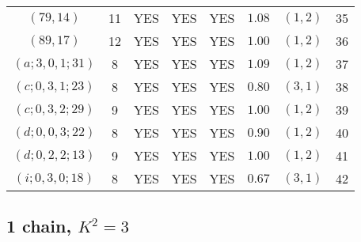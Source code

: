\begin{longtable}{|c|c|c|c|c|c|c|c|}
$(79,14)$ & 11 & YES & YES & YES & $1.08$ & $(1,2)$ & 35\\
$(89,17)$ & 12 & YES & YES & YES & $1.00$ & $(1,2)$ & 36\\
$(a;3,0,1;31)$ & 8 & YES & YES & YES & $1.09$ & $(1,2)$ & 37\\
$(c;0,3,1;23)$ & 8 & YES & YES & YES & $0.80$ & $(3,1)$ & 38\\
$(c;0,3,2;29)$ & 9 & YES & YES & YES & $1.00$ & $(1,2)$ & 39\\
$(d;0,0,3;22)$ & 8 & YES & YES & YES & $0.90$ & $(1,2)$ & 40\\
$(d;0,2,2;13)$ & 9 & YES & YES & YES & $1.00$ & $(1,2)$ & 41\\
$(i;0,3,0;18)$ & 8 & YES & YES & YES & $0.67$ & $(3,1)$ & 42
\end{longtable}
\subsection{1 chain, $K^2 = 3$}
